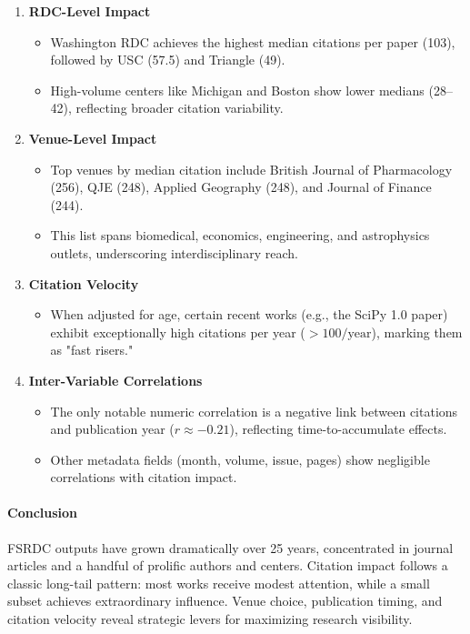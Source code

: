 \documentclass[12pt]{article}
\begin{document}
\begin{enumerate}
  \item \textbf{RDC-Level Impact}
    \begin{itemize}
      \item Washington RDC achieves the highest median citations per paper (103), followed by USC (57.5) and Triangle (49).
      \item High-volume centers like Michigan and Boston show lower medians (28–42), reflecting broader citation variability.
    \end{itemize}

  \item \textbf{Venue-Level Impact}
    \begin{itemize}
      \item Top venues by median citation include British Journal of Pharmacology (256), QJE (248), Applied Geography (248), and Journal of Finance (244).
      \item This list spans biomedical, economics, engineering, and astrophysics outlets, underscoring interdisciplinary reach.
    \end{itemize}

  \item \textbf{Citation Velocity}
    \begin{itemize}
      \item When adjusted for age, certain recent works (e.g., the SciPy 1.0 paper) exhibit exceptionally high citations per year (\(>100/\text{year}\)), marking them as "fast risers."
    \end{itemize}

  \item \textbf{Inter-Variable Correlations}
    \begin{itemize}
      \item The only notable numeric correlation is a negative link between citations and publication year (\(r\approx -0.21\)), reflecting time-to-accumulate effects.
      \item Other metadata fields (month, volume, issue, pages) show negligible correlations with citation impact.
    \end{itemize}
\end{enumerate}

\paragraph*{Conclusion}
FSRDC outputs have grown dramatically over 25 years, concentrated in journal articles and a handful of prolific authors and centers. Citation impact follows a classic long-tail pattern: most works receive modest attention, while a small subset achieves extraordinary influence. Venue choice, publication timing, and citation velocity reveal strategic levers for maximizing research visibility.
\end{document}
